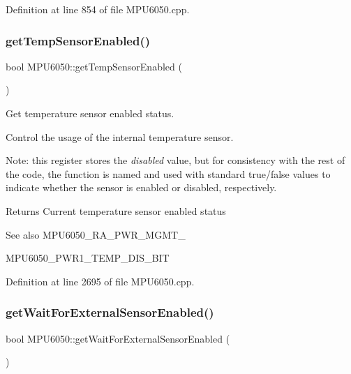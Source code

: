 Definition at line 854 of file M\+P\+U6050.\+cpp.

\mbox{\label{classMPU6050_a31f588beab6760258212c65725eba336}} 
\subsubsection{\texorpdfstring{getTempSensorEnabled()}{getTempSensorEnabled()}}
{\footnotesize\ttfamily bool M\+P\+U6050\+::get\+Temp\+Sensor\+Enabled (\begin{DoxyParamCaption}{ }\end{DoxyParamCaption})}



Get temperature sensor enabled status. 

Control the usage of the internal temperature sensor.

Note\+: this register stores the {\itshape disabled} value, but for consistency with the rest of the code, the function is named and used with standard true/false values to indicate whether the sensor is enabled or disabled, respectively.

\begin{DoxyReturn}{Returns}
Current temperature sensor enabled status 
\end{DoxyReturn}
\begin{DoxySeeAlso}{See also}
M\+P\+U6050\+\_\+\+R\+A\+\_\+\+P\+W\+R\+\_\+\+M\+G\+M\+T\+\_ 

M\+P\+U6050\+\_\+\+P\+W\+R1\+\_\+\+T\+E\+M\+P\+\_\+\+D\+I\+S\+\_\+\+B\+IT 
\end{DoxySeeAlso}


Definition at line 2695 of file M\+P\+U6050.\+cpp.

\mbox{\label{classMPU6050_a4e2ebda47b85b4c5463f041c790bf5c0}} 
\subsubsection{\texorpdfstring{getWaitForExternalSensorEnabled()}{getWaitForExternalSensorEnabled()}}
{\footnotesize\ttfamily bool M\+P\+U6050\+::get\+Wait\+For\+External\+Sensor\+Enabled (\begin{DoxyParamCaption}{ }\end{DoxyParamCaption})}



